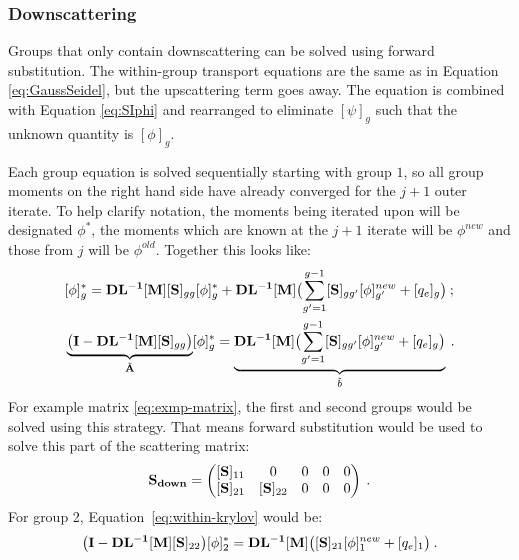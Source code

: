 \subsubsection{Downscattering}
Groups that only contain downscattering can be solved using forward substitution. The within-group transport equations are the same as in Equation \eqref{eq:GaussSeidel}, but the upscattering term goes away. The equation is combined with Equation \eqref{eq:SIphi} and rearranged to eliminate $[\psi]_{g}$ such that the unknown quantity is $[\phi]_{g}$. 

Each group equation is solved sequentially starting with group $1$, so all group moments on the right hand side have already converged for the $j+1$ outer iterate. To help clarify notation, the moments being iterated upon will be designated $\phi^{*}$, the moments which are known at the $j+1$ iterate will be $\phi^{new}$ and those from $j$ will be $\phi^{old}$. Together this looks like:
\begin{align}
  &[\phi]_{g}^{*} =  \mathbf{DL^{-1}}[\mathbf{M}][\mathbf{S}]_{gg}[\phi]_{g}^{*} +  \mathbf{DL^{-1}}[\mathbf{M}] \bigl(  \sum_{g'=1}^{g-1} [\mathbf{S}]_{gg'}[\phi]_{g'}^{new} + [q_{e}]_{g} \bigr) \label{eq:within-unarranged} \:;  \\
  &\underbrace{\bigl( \mathbf{I} - \mathbf{DL^{-1}}[\mathbf{M}][\mathbf{S}]_{gg} \bigr)}_{\tilde{\mathbf{A}}}[\phi]_{g}^{*} = \underbrace{\mathbf{DL^{-1}}  [\mathbf{M}] \bigl(  \sum_{g'=1}^{g-1} [\mathbf{S}]_{gg'}[\phi]_{g'}^{new} + [q_{e}]_{g} \bigr) }_{\tilde{b}} \label{eq:within-krylov} \:. 
\end{align}
%
For example matrix \eqref{eq:exmp-matrix}, the first and second groups would be solved using this strategy. That means forward substitution would be used to solve this part of the scattering matrix:
%
\begin{equation}
  \mathbf{S_{down}} = \begin{pmatrix}
      [\ve{S}]_{11} &0 & 0 & 0 & 0 \\
      [\ve{S}]_{21} & [\ve{S}]_{22} & 0 & 0 & 0 \\  
      \end{pmatrix} \:.
          \label{eq:down-matrix}
\end{equation}
%
For group 2, Equation~\eqref{eq:within-krylov} would be:
%
\begin{equation}
  \bigl( \mathbf{I} - \mathbf{DL^{-1}}[\mathbf{M}][\mathbf{S}]_{22} \bigr)[\phi]_{2}^{*} = \mathbf{DL^{-1}}[\mathbf{M}] \bigl( [\mathbf{S}]_{21}[\phi]_{1}^{new}  + [q_{e}]_{1} \bigr) \:.
\end{equation}

